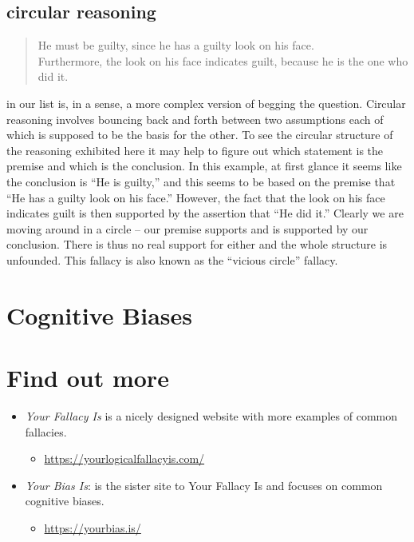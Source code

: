\documentclass[justified]{tufte-book}
\providecommand{\tightlist}{%
  \setlength{\itemsep}{0pt}\setlength{\parskip}{0pt}}
\newenvironment{argument}{\begin{quote}\normalsize}{\end{quote}}
\begin{document}
\hypertarget{circular-reasoning}{%
\subsection*{circular reasoning}\label{circular-reasoning}}

\begin{argument}
He must be guilty, since he has a guilty look on his face.\\
Furthermore, the look on his face indicates guilt, because he is the one
who did it.
\end{argument}

 in our list is, in a sense, a more complex version of begging the question. Circular reasoning involves bouncing back and forth between two assumptions each of which is supposed to be the basis for the other. To see the circular structure of the reasoning exhibited here it may help to figure out which statement is the premise and which is the conclusion. In this example, at first glance it seems like the conclusion is ``He is guilty,'' and this seems to be based on the premise that ``He has a guilty look on his face.'' However, the fact that the look on his face indicates guilt is then supported by the assertion that ``He did it.'' Clearly we are moving around in a circle -- our premise supports and is supported by our conclusion. There is thus no real support for either and the whole structure is unfounded. This fallacy is also known as the ``vicious circle'' fallacy.

\hypertarget{cognitive-biases}{%
\section{Cognitive Biases}\label{cognitive-biases}}

\hypertarget{find-out-more}{%
\section*{Find out more}\label{find-out-more}}

\begin{itemize}
\tightlist
\item
  \emph{Your Fallacy Is} is a nicely designed website with more examples of common fallacies.

  \begin{itemize}
  \tightlist
  \item
    \url{https://yourlogicalfallacyis.com/}
  \end{itemize}
\item
  \emph{Your Bias Is}: is the sister site to Your Fallacy Is and focuses on common cognitive biases.

  \begin{itemize}
  \tightlist
  \item
    \url{https://yourbias.is/}
  \end{itemize}
\end{itemize}
\end{document}
